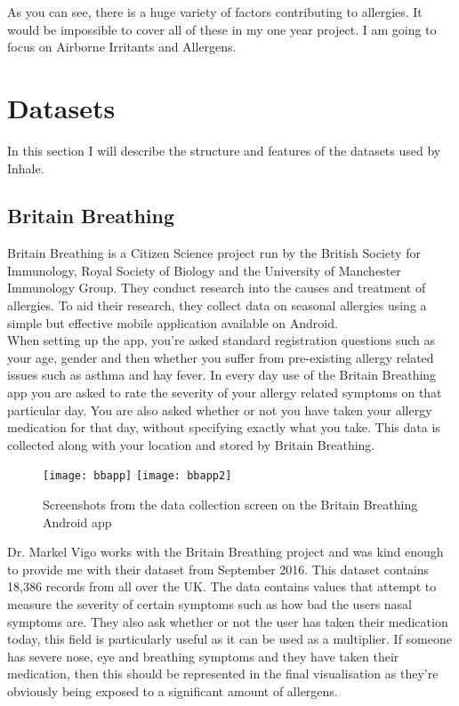 As you can see, there is a huge variety of factors contributing to allergies. It would be impossible to cover all of these in my one year project. I am going to focus on Airborne Irritants and Allergens.


\section{Datasets}

In this section I will describe the structure and features of the datasets used by Inhale.\\

\subsection{Britain Breathing}

Britain Breathing is a Citizen Science project run by the British Society for Immunology, Royal Society of Biology and the University of Manchester Immunology Group. They conduct research into the causes and treatment of allergies. To aid their research, they collect data on seasonal allergies using a simple but effective mobile application available on Android.\\

When setting up the app, you're asked standard registration questions such as your age, gender and then whether you suffer from pre-existing allergy related issues such as asthma and hay fever. In every day use of the Britain Breathing app you are asked to rate the severity of your allergy related symptoms on that particular day. You are also asked whether or not you have taken your allergy medication for that day, without specifying exactly what you take. This data is collected along with your location and stored by Britain Breathing.

\begin{figure}[H]
\begin{center}
\texttt{[image: bbapp]}
\texttt{[image: bbapp2]}
\caption{Screenshots from the data collection screen on the Britain Breathing Android app}
\label{fig:bbscrn}
\end{center}
\end{figure}

Dr. Markel Vigo works with the Britain Breathing project and was kind enough to provide me with their dataset from September 2016. This dataset contains 18,386 records from all over the UK. The data contains values that attempt to measure the severity of certain symptoms such as how bad the users nasal symptoms are. They also ask whether or not the user has taken their medication today, this field is particularly useful as it can be used as a multiplier. If someone has severe nose, eye and breathing symptoms and they have taken their medication, then this should be represented in the final visualisation as they're obviously being exposed to a significant amount of allergens.\\

